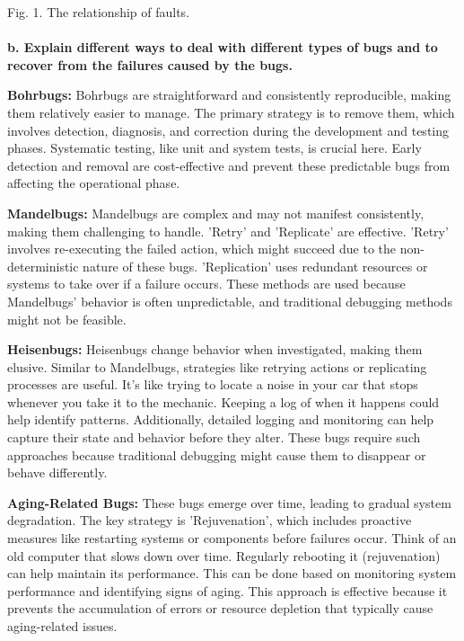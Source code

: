 \documentclass[12pt]{article}
\numberwithin{table}{section}
\begin{document}
	Fig. 1. The relationship of faults.\\
	\\
	\textbf{b. Explain different ways to deal with different types of bugs and to recover from the failures caused by the bugs. }
	
	\textbf{Bohrbugs:} Bohrbugs are straightforward and consistently reproducible, making them relatively easier to manage. The primary strategy is to remove them, which involves detection, diagnosis, and correction during the development and testing phases. Systematic testing, like unit and system tests, is crucial here. Early detection and removal are cost-effective and prevent these predictable bugs from affecting the operational phase.
	
	\textbf{Mandelbugs:}  Mandelbugs are complex and may not manifest consistently, making them challenging to handle. 'Retry' and 'Replicate' are effective. 'Retry' involves re-executing the failed action, which might succeed due to the non-deterministic nature of these bugs. 'Replication' uses redundant resources or systems to take over if a failure occurs. These methods are used because Mandelbugs' behavior is often unpredictable, and traditional debugging methods might not be feasible.
	
	\textbf{Heisenbugs:} Heisenbugs change behavior when investigated, making them elusive. Similar to Mandelbugs, strategies like retrying actions or replicating processes are useful. It's like trying to locate a noise in your car that stops whenever you take it to the mechanic. Keeping a log of when it happens could help identify patterns. Additionally, detailed logging and monitoring can help capture their state and behavior before they alter. These bugs require such approaches because traditional debugging might cause them to disappear or behave differently.
	
	\textbf{Aging-Related Bugs:} These bugs emerge over time, leading to gradual system degradation. The key strategy is 'Rejuvenation', which includes proactive measures like restarting systems or components before failures occur. Think of an old computer that slows down over time. Regularly rebooting it (rejuvenation) can help maintain its performance. This can be done based on monitoring system performance and identifying signs of aging. This approach is effective because it prevents the accumulation of errors or resource depletion that typically cause aging-related issues.
	
			
		
\end{document}
